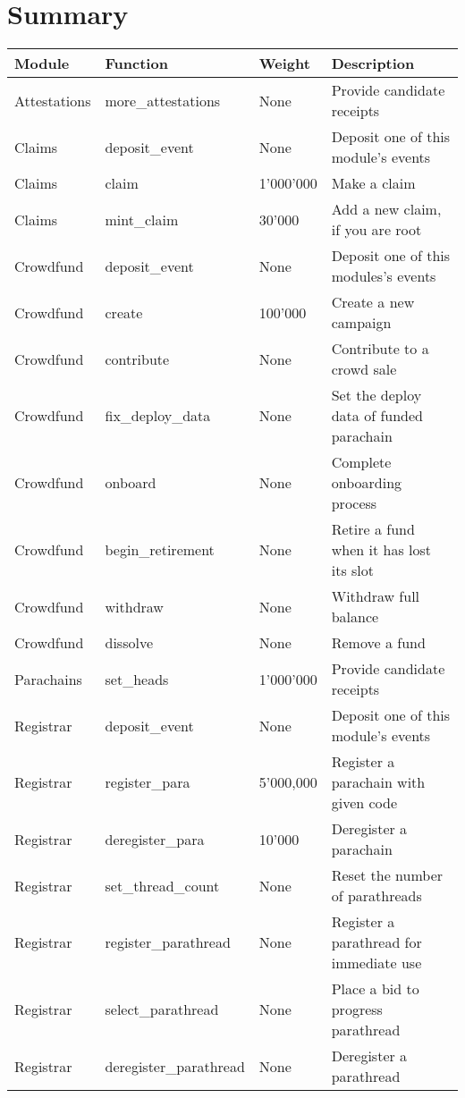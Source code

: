 \documentclass[11pt,a4paper]{article}
\begin{document}
\section*{Summary}
\begin{center}
  \begin{tabulary}{1.0\textwidth}{LLLL}
    \textbf{Module} & \textbf{Function} & \textbf{Weight} & \textbf{Description} \\
    \hline
    Attestations & more\_attestations & None & Provide candidate receipts \\
    Claims & deposit\_event & None & Deposit one of this module's events \\
    Claims & claim & 1'000'000 & Make a claim \\
    Claims & mint\_claim & 30'000 & Add a new claim, if you are root \\
    Crowdfund & deposit\_event & None & Deposit one of this modules's events \\
    Crowdfund & create & 100'000 & Create a new campaign  \\
    Crowdfund & contribute & None & Contribute to a crowd sale \\
    Crowdfund & fix\_deploy\_data & None & Set the deploy data of funded parachain \\
    Crowdfund & onboard & None & Complete onboarding process \\
    Crowdfund & begin\_retirement & None & Retire a fund when it has lost its slot \\
    Crowdfund & withdraw & None & Withdraw full balance \\
    Crowdfund & dissolve & None & Remove a fund \\
    Parachains & set\_heads & 1'000'000 & Provide candidate receipts \\
    Registrar & deposit\_event & None & Deposit one of this module's events \\
    Registrar & register\_para & 5'000,000 & Register a parachain with given code \\
    Registrar & deregister\_para & 10'000 & Deregister a parachain \\
    Registrar & set\_thread\_count & None & Reset the number of parathreads \\
    Registrar & register\_parathread & None & Register a parathread for immediate use \\
    Registrar & select\_parathread & None & Place a bid to progress parathread \\
    Registrar & deregister\_parathread & None & Deregister a parathread \\

\end{tabulary}
\end{center}
\end{document}
